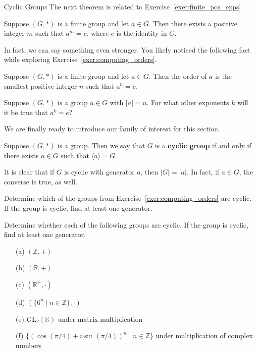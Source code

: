 \begin{section}{Cyclic Groups}
The next theorem is related to Exercise~\ref{exer:finite_pos_exps}.

\begin{theorem}
Suppose \((G,*)\) is a finite group and let \(a\in G\).  Then there exists a positive integer \(m\) such that \(a^m=e\), where \(e\) is the identity in \(G\). 
\end{theorem}

In fact, we can say something even stronger.  You likely noticed the following fact while exploring Exercise~\ref{exer:computing_orders}.

\begin{theorem}
Suppose \((G,*)\) is a finite group and let \(a\in G\).  Then the order of \(a\) is the smallest positive integer \(n\) such that \(a^n=e\).
\end{theorem}

\begin{problem}
Suppose \((G,*)\) is a group \(a\in G\) with \(|a|=n\).  For what other exponents \(k\) will it be true that \(a^k=e\)?
\end{problem}

We are finally ready to introduce our family of interest for this section.

\begin{definition}
Suppose \((G,*)\) is a group.  Then we say that \(G\) is a \textbf{cyclic group} if and only if there exists \(a\in G\) such that \(\langle a\rangle =G\).
\end{definition}

It is clear that if \(G\) is cyclic with generator \(a\), then \(|G|=|a|\).  In fact, if \(a\in G\), the converse is true, as well.

\begin{exercise}
Determine which of the groups from Exercise~\ref{exer:computing_orders} are cyclic.  If the group is cyclic, find at least one generator.
\end{exercise}

\begin{exercise}
Determine whether each of the following groups are cyclic.  If the group is cyclic, find at least one generator.
\begin{multicols}{2}
\begin{enumerate}
\item[(a)] \((\mathbb{Z},+)\)
\item[(b)] \((\mathbb{R},+)\)
\item[(c)] \((\mathbb{R}^+,\cdot)\)
\item[(d)] \((\{6^n\mid n\in\mathbb{Z}\},\cdot)\)
\end{enumerate}
\end{multicols}
\begin{enumerate}
\item[(e)] \(\textrm{GL}_2(\mathbb{R})\) under matrix multiplication
\item[(f)] \(\{(\cos(\pi/4) +i\sin(\pi/4))^n\mid n\in \mathbb{Z}\}\) under multiplication of complex numbers
\end{enumerate}
\end{exercise}


\end{section}
